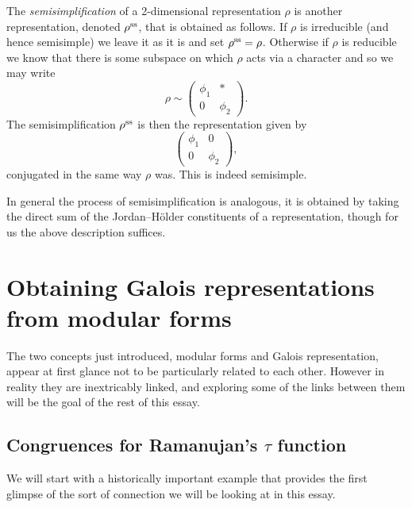 \documentclass[a4paper,12pt]{article}
\begin{document}
\begin{defn}\label{def:semisimp}
The \emph{semisimplification} of a 2-dimensional representation $\rho$ is another representation, denoted $\rho^\text{ss}$, that is obtained as follows.
If $\rho$ is irreducible (and hence semisimple) we leave it as it is and set $\rho^\text{ss} = \rho$.
Otherwise if $\rho$ is reducible we know that there is some subspace on which $\rho$ acts via a character and so we may write
\[
\rho \sim
\begin{pmatrix}
\phi_1 & * \\
0      & \phi_2
\end{pmatrix}.
\]
The semisimplification $\rho^\text{ss}$ is then the representation given by
\[
\begin{pmatrix}
\phi_1 & 0 \\
0      & \phi_2
\end{pmatrix},
\]
conjugated in the same way $\rho$ was.
This is indeed semisimple.

In general the process of semisimplification is analogous, it is obtained by taking the direct sum of the Jordan--H\"older constituents of a representation, though for us the above description suffices.
\end{defn}



\section{Obtaining Galois representations from modular forms}
The two concepts just introduced, modular forms and Galois representation, appear at first glance not to be particularly related to each other.
However in reality they are inextricably linked, and exploring some of the links between them will be the goal of the rest of this essay.

\subsection{Congruences for Ramanujan's $\tau$ function}
We will start with a historically important example that provides the first glimpse of the sort of connection we will be looking at in this essay.
\end{document}
